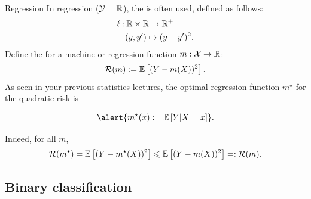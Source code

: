 \documentclass[xcolor={usenames,dvipsnames},handout]{beamer}
\begin{document}
\begin{frame}{Regression}
In regression (${\mathcal{Y}} = \mathbb{R}$), the  is often used, defined as follows:
\begin{align*}
\ell :  & \, \mathbb{R} \times \mathbb{R} \to \mathbb{R}^+ \\
& (y,y') \mapsto (y-y')^2.
\end{align*}
Define the  for a machine or regression function $m :{\mathcal{X}} \to \mathbb{R}$:
\begin{align*}
{\mathcal{R}}(m) := \mathbb{E} \left[ (Y-m(X) )^2 \right].
\end{align*}
As seen in your previous statistics lectures, the optimal regression function $m^\star$ for the quadratic risk is 

\begin{align*}
\alert{m^\star(x) := \E \left[ Y | X=x \right]}.
\end{align*}

Indeed, for all $m$,
$$
{\mathcal{R}}(m^\star) = \mathbb{E} \left[ (Y-m^\star(X) )^2 \right] \leqslant \mathbb{E} \left[ (Y-m(X) )^2 \right] =: {\mathcal{R}}(m).
$$
\end{frame}

%
%



\subsection{Binary classification}
\end{document}
